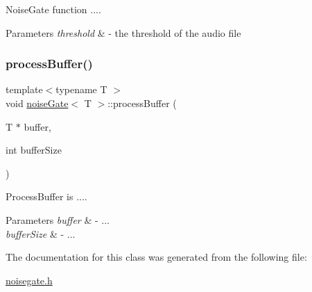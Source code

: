 Noise\+Gate function .... 
\begin{DoxyParams}{Parameters}
{\em threshold} & -\/ the threshold of the audio file \\
\hline
\end{DoxyParams}
\mbox{\label{classnoiseGate_a24c7bf2408489d8f97904de70641b4a2}} 
\subsubsection{\texorpdfstring{process\+Buffer()}{processBuffer()}}
{\footnotesize\ttfamily template$<$typename T $>$ \\
void \hyperlink{classnoiseGate}{noise\+Gate}$<$ T $>$\+::process\+Buffer (\begin{DoxyParamCaption}\item[{T $\ast$}]{buffer,  }\item[{int}]{buffer\+Size }\end{DoxyParamCaption})}

Process\+Buffer is .... 
\begin{DoxyParams}{Parameters}
{\em buffer} & -\/ ... \\
\hline
{\em buffer\+Size} & -\/ ... \\
\hline
\end{DoxyParams}


The documentation for this class was generated from the following file\+:\begin{DoxyCompactItemize}
\item 
\hyperlink{noisegate_8h}{noisegate.\+h}\end{DoxyCompactItemize}
